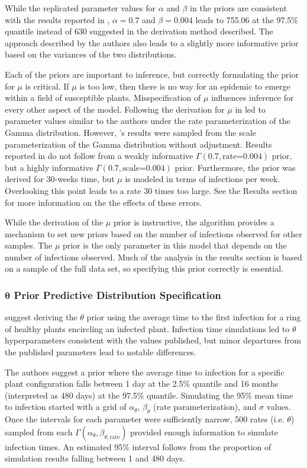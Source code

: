 \documentclass{uwstat572}
\begin{document}
While the replicated parameter values for $\alpha$ and $\beta$ in the priors are consistent with the results reported in \citep{Brown}, $\alpha=0.7$ and $\beta=0.004$ leads to 755.06 at the 97.5\% quantile instead of 630 suggested in the derivation method described. 
The approach described by the authors also leads to a slightly more informative prior based on the variances of the two distributions. 

Each of the priors are important to inference, but correctly formulating the prior for $\mu$ is critical. 
If $\mu$ is too low, then there is no way for an epidemic to emerge within a field of susceptible plants. 
Misspecification of $\mu$ influences inference for every other aspect of the model. 
Following the derivation for $\mu$ in \citet{Brown} led to parameter values similar to the authors under the rate parameterization of the Gamma distribution. 
However, \citep{Brown}'s results were sampled from the scale parameterization of the Gamma distribution without adjustment.
Results reported in \citet{Brown} do not follow from a weakly informative $\Gamma(0.7, \text{rate=}0.004)$ prior, but a highly informative $\Gamma(0.7, \text{scale=}0.004)$ prior. 
Furthermore, the prior was derived for 30-weeks time, but $\mu$ is modeled in terms of infections per week. 
Overlooking this point leads to a rate 30 times too large. 
See the Results section for more information on the the effects of these errors. 

While the derivation of the $\mu$ prior is instructive, the algorithm provides a mechanism to set new priors based on the number of infections observed for other samples. 
The $\mu$ prior is the only parameter in this model that depends on the number of infections observed. 
Much of the analysis in the results section is based on a sample of the full data set, so specifying this prior correctly is essential. 

\subsubsection{$\boldsymbol{\theta}$ Prior Predictive Distribution Specification}
\citet{Brown} suggest deriving the $\theta$ prior using the average time to the first infection for a ring of healthy plants encircling an infected plant. 
Infection time simulations led to $\theta$ hyperparameters consistent with the values published, but minor departures from the published parameters lead to notable differences.

The authors suggest a prior where the average time to infection for a specific plant configuration falls between 1 day at the 2.5\% quantile and 16 months (interpreted as 480 days) at the 97.5\% quantile.
Simulating the 95\% mean time to infection started with a grid of $\alpha_{\theta}$, $\beta_{\theta}$ (rate parameterization), and $\sigma$ values. 
Once the intervals for each parameter were sufficiently narrow, 500 rates (i.e. $\theta$) sampled from each $\Gamma(\alpha_{\theta}, \beta_{\theta, \text{rate}})$ provided enough information to simulate infection times.
An estimated 95\% interval follows from the proportion of simulation results falling between 1 and 480 days. 
\end{document}

